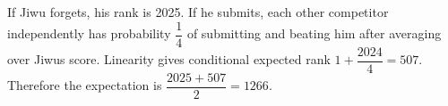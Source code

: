 If Jiwu forgets, his rank is 2025. If he submits, each other competitor independently has probability $\dfrac{1}{4}$ of submitting and beating him after averaging over Jiwu\textquotesingle s score. Linearity gives conditional expected rank $1 + \dfrac{2024}{4} = 507$. Therefore the expectation is $\dfrac{2025+507}{2} = \boxed{1266}$.
